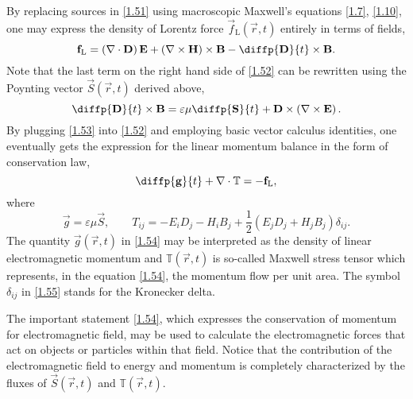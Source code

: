 By replacing sources in \ref{1.51} using macroscopic Maxwell's equations \ref{1.7}, \ref{1.10}, one may express the density of Lorentz force $ \vec{f}_\mathrm{L} \left( \vec{r}, t \right) $ entirely in terms of fields,
\begin{equation}
\label{1.52}
\vec{f}_\mathrm{L} = \left(\div{\vec{D}} \right) \vec{E} + \left(\rot{\vec{H}} \right) \times \vec{B} - \diffp{\vec{D}}{t} \times \vec{B}.
\end{equation}
Note that the last term on the right hand side of \ref{1.52} can be rewritten using the Poynting vector $ \vec{S}\left( \vec{r}, t \right) $ derived above, 
\begin{equation}
\label{1.53}
\diffp{\vec{D}}{t} \times \vec{B} = \varepsilon \mu \diffp{\vec{S}}{t} + \vec{D} \times \left(\rot{\vec{E}} \right).
\end{equation}
By plugging \ref{1.53} into \ref{1.52} and employing basic vector calculus identities, one eventually gets the expression for the linear momentum balance in the form of conservation law,
\begin{equation}
\label{1.54}
\diffp{\vec{g}}{t} + \div{\mathbb{T}} = -\vec{f}_\mathrm{L},
\end{equation}
where
\begin{equation}
\label{1.55}
\vec{g} = \varepsilon \mu \vec{S}, \qquad T_{ij} = - E_i D_j - H_i B_j + \frac{1}{2} \left(E_j D_j + H_j B_j \right) \delta_{ij}.
\end{equation}
The quantity $ \vec{g}\left( \vec{r}, t \right) $ in \ref{1.54} may be interpreted as the density of linear electromagnetic momentum and $ \mathbb{T}\left( \vec{r}, t \right) $ is so-called Maxwell stress tensor which represents, in the equation \ref{1.54}, the momentum flow per unit area. The symbol $ \delta_{ij} $ in \ref{1.55} stands for the Kronecker delta.

The important statement \ref{1.54}, which expresses the conservation of momentum for electromagnetic field, may be used to calculate the electromagnetic forces that act on objects or particles within that field. Notice that the contribution of the electromagnetic field to energy and momentum is completely characterized by the fluxes of $ \vec{S}\left( \vec{r}, t \right) $ and $ \mathbb{T}\left( \vec{r}, t \right) $.


